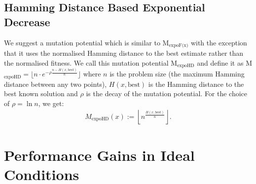 \documentclass[lettersize,journal]{IEEEtran}
\newcommand{\expoF}{M$_{\text{expoF(x)}}$}
\newcommand{\expoHD}{M$_{\text{expoHD}}$}
\begin{document}
 \subsection*{Hamming Distance Based Exponential Decrease}
We suggest a mutation potential which is similar to {\expoF } with the exception that it uses the normalised Hamming distance to the best estimate rather than the normalised fitness. We call this mutation potential {\expoHD } and define it as \expoHD$=\lfloor n \cdot e^{-\rho \frac{n-H(x,\text{best})}{n}}\rfloor$ where $n$ is the problem size (the maximum Hamming distance between  any two  points), $H(x,\text{best})$ is the Hamming distance to the best known solution and $\rho$ is the decay of the mutation potential. For the choice of $\rho=\ln n$, we get: \begin{align*}M_{\text{expoHD}}(x):=\left\lfloor n^{\frac{H(x,\text{best})}{n}} \right\rfloor.
 	\end{align*}
 	
 	
\section{Performance Gains in Ideal Conditions}\label{sec:OptKnown} 
\end{document}
